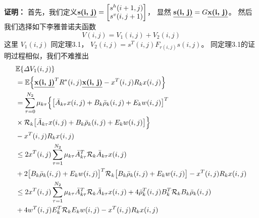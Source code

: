 	{\bf 证明：} 
	首先，我们定义$\emph{\textbf{s(i, j)}} = \begin{bmatrix}
	s^{h}(i+1,j)\\ s^{v}(i,j+1)
	\end{bmatrix}$，  显然 $\emph{\textbf{s(i, j)}}=G\emph{\textbf{x(i, j)}}$。 然后我们选择如下李雅普诺夫函数
	\begin{equation}\label{LyapunoovT}
	V(i,j)=V_{1}(i,j)+V_{2}(i,j)
	\end{equation}
	这里 $V_{1}(i,j)$ 同定理3.1， $V_{2}(i,j)=s^{T}(i,j)F_{r(i,j)}s(i,j)$。 同定理3.1的证明过程相似，我们不难推出
	\begin{equation} \label{P2T1}
	\begin{split}
	&\mathbb{E}\{\varDelta V_{1}(i,j) \}\\
	&=\mathbb{E}\Big\{\emph{\textbf{x(i, j)}}^{T}R^{*}(i,j)\emph{\textbf{x(i, j)}} - x^{T}(i,j)R_{k}x(i,j)\Big\}\\
	&=  \sum_{\tau =0}^{N_{2}}\mu_{k\tau }\Big\{\big[\bar{A}_{k\tau }x(i,j)+B_{k}\bar{\rho}_{k}(i,j)+E_{k}w(i,j)\big]^{T}\\
	&\times\mathcal{R}_{k} \big[ \bar{A}_{k\tau }x(i,j)+B_{k}\bar{\rho}_{k}(i,j)+E_{k}w(i,j)\big]\Big\}\\
	&-x^{T}(i,j)R_{k}x(i,j)\\
	&\leq 2x^{T}(i,j)\sum_{\tau =1}^{N_{2}}\mu_{k\tau }\bar{A}^{T}_{k\tau }\mathcal{R}_{k}\bar{A}_{k\tau }x(i,j) \\
	&+2\big[B_{k}\bar{\rho}_{k}(i,j)+E_{k}w(i,j)\big]^{T}\mathcal{R}_{k} \big[B_{k}\bar{\rho}_{k}(i,j)+E_{k}w(i,j)\big]
	-x^{T}(i,j)R_{k}x(i,j)\\
	&\leq 2x^{T}(i,j)\sum_{\tau =1}^{N_{2}}\mu_{k\tau }\bar{A}^{T}_{k\tau }\mathcal{R}_{k}\bar{A}_{k\tau }x(i,j) 
	+ 4\bar{\rho}^{T}_{k}(i,j)B^{T}_{k}\mathcal{R}_{k}B_{k}\bar{\rho}_{k}(i,j)\\
	&+4w^{T}(i,j)E^{T}_{k}\mathcal{R}_{k}E_{k}w(i,j)
	-x^{T}(i,j)R_{k}x(i,j)

\end{split}
\end{equation}
